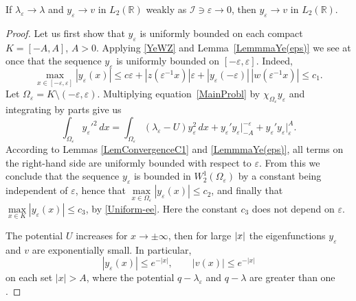 \documentclass[11pt,english]{amsart}%
\begin{document}
\begin{g_lemma}\label{LemmaL2convergence}
If $\lambda_\varepsilon\to\lambda$ and $y_\varepsilon\to v$ in $L_2(\mathbb{R})$ weakly as $\mathcal{I}\ni\varepsilon\to0$, then $y_\varepsilon\to v$ in $L_2(\mathbb{R})$.
\end{g_lemma}
\begin{proof}
Let us first show that $y_\varepsilon$ is uniformly bounded on each compact $K=[-A,A]$, $A>0$.
Applying \eqref{YeWZ} and Lemma~\ref{LemmmaYe(eps)} we see at once that the sequence $y_\varepsilon$
is uniformly bounded on $[-\varepsilon,\varepsilon]$.
Indeed,
\begin{equation}\label{Uniform-ee}
\max\limits_{x\in[-\varepsilon,\varepsilon]}|y_\varepsilon(x)|\leq c\varepsilon+|z(\varepsilon^{-1}x)|\varepsilon+|y_\varepsilon(-\varepsilon)|\,|w(\varepsilon^{-1}x)|\leq c_1.
\end{equation}
Let $\Omega_\varepsilon=K\setminus (-\varepsilon,\varepsilon)$.
Multiplying equation~\eqref{MainProbl} by $\chi_{\Omega_\varepsilon}y_\varepsilon$ and integrating
by parts give us
\begin{equation*}
   \int_{\Omega_\varepsilon}y_\varepsilon'^{2}\,dx=
\int_{\Omega_\varepsilon}(\lambda_\varepsilon-U)y_\varepsilon^2\,dx+y_\varepsilon'y_\varepsilon\Big|_{-A}^{-\varepsilon}+y_\varepsilon'y_\varepsilon\Big|^{A}_{\varepsilon}.
\end{equation*}
According to Lemmas \ref{LemConvergenceC1} and \ref{LemmmaYe(eps)}, all terms on the right-hand side are uniformly bounded with respect to $\varepsilon$.
From this we conclude that the sequence $y_\varepsilon$ is bounded in $W^1_2(\Omega_\varepsilon)$ by a constant being independent of $\varepsilon$, hence that  $\max\limits_{x\in\Omega_\varepsilon} |y_\varepsilon(x)|\leq c_2$, and finally that $\max\limits_{x\in K}|y_\varepsilon(x)|\leq c_3$, by
\eqref{Uniform-ee}.
Here the constant $c_3$ does not depend on $\varepsilon$.


The potential $U$ increases for $x\to\pm\infty$, then for large $\left\vert x\right\vert$ the eigenfunctions $y_\varepsilon$ and $v$ are exponentially small.
In particular,
$$
    |y_\varepsilon(x)|\leq e^{-|x|},\qquad|v(x)|\leq e^{-|x|}
$$
on each set $|x|>A$, where the potential $q-\lambda_\varepsilon$ and $q-\lambda$ are greater than one \cite[p.~59]{BS}.



\end{proof}
\end{document}

